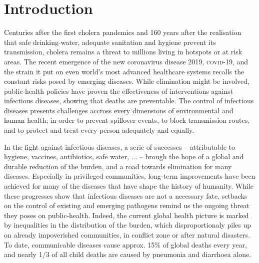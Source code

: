 \chapter*{Introduction} %
 Centuries after the first cholera pandemics and 160 years after the realisation that safe drinking-water, adequate sanitation and hygiene prevent its transmission, cholera remains a threat to millions living in hotspots or at risk areas. The recent emergence of the new coronavirus disease 2019, \textsc{covid}-19, and the strain it put on even world's most advanced healthcare systems recalls the constant risks posed by emerging diseases. 
While elimination might be involved, public-health policies have proven the effectiveness of interventions against infectious diseases, showing that deaths are preventable. The control of infectious diseases presents challenges accross every dimensions of environmental and human health; in order to prevent spillover events, to block transmission routes, and to protect and treat every person adequately and equally. 

In the fight against infectious diseases, a serie of successes -- attributable to \eg hygiene, vaccines, antibiotics, safe water, ... -- brough the hope of a global and durable reduction of the burden, and a road towards elimination for many diseases. Especially in privileged communities, long-term improvements have been achieved for many of the diseases that have shape the history of humanity. While these progresses show that infectious diseases are not a necessary fate, setbacks on the control of existing and emerging pathogens remind us the ongoing threat they poses on public-health. Indeed, the current global health picture is marked by inequalities in the distribution of the burden, which disproportionaly piles up on already impoverished communities, in conflict zone or after natural disasters. To date, communicable diseases cause approx. 15\% of global deaths every year\cite[-4\baselineskip][Table 1, excl. non-transmissible neonatal and maternal diseases and nutritional diseases; pre-\textsc{covid}-19 estimates]{Roth:GlobalRegionalNational:2018}, and nearly 1/3 of all child deaths are caused by pneumonia and diarrhoea alone\cite[][\textsc{M} deaths among under 5, every year.]{WHO:EndingPreventableChild:2013}.
 

